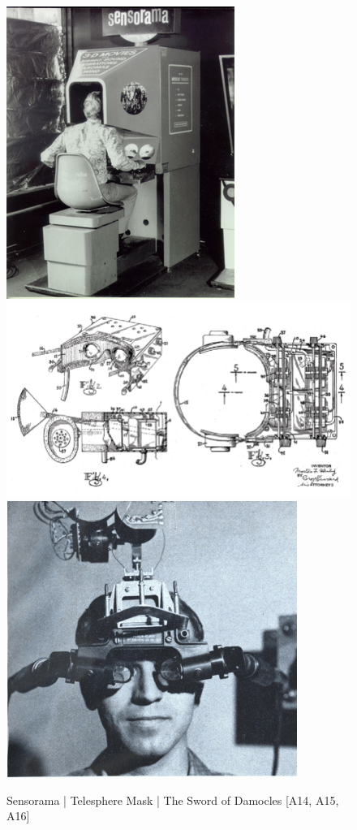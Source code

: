 \begin{figure}[h]
	\centering
	\includegraphics[width=0.3\linewidth]{Bilder/A14_Sensorama}
	\includegraphics[width=0.3\linewidth]{Bilder/A15_TelesphereMask}
	\includegraphics[width=0.3\linewidth]{Bilder/A16_SwordDamocles}
	\caption{Sensorama | Telesphere Mask | The Sword of Damocles [A14, A15, A16]}
	\label{fig:SensoramaTelesphereSword}
\end{figure}

